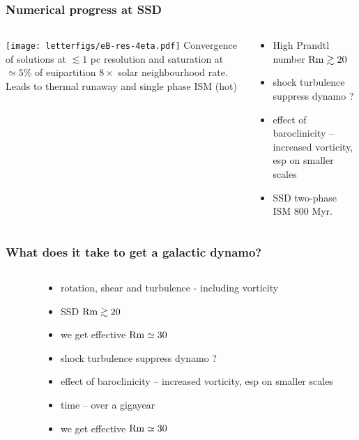 \documentclass{beamer}
\newcommand\Rm{{\rm Rm} }
\begin{document}
    \begin{frame}
      \frametitle{Numerical progress at SSD}
    \begin{columns}
      \begin{column}[]{6.5cm}
      \texttt{[image: letterfigs/eB-res-4eta.pdf]}
      {\footnotesize{
      Convergence of solutions at $\lesssim1$ pc resolution \cite{GMKS22}
      and saturation at $\simeq5$\% of euipartition 
      $8\times$ solar neighbourhood rate.\\
      Leads to thermal runaway \cite{LOCBN15} and single phase ISM (hot)}} 
      \end{column}
      \begin{column}[]{5.0cm}
      {\footnotesize{
      \begin{itemize}
        \item High Prandtl number $\Rm\gtrsim20$ \cite{SBK02,HB04,Schober12,SBSW20} 
        \item shock turbulence suppress dynamo \cite{Haugen:2004M,FCSBKS11,FSBS14}?
        \item effect of baroclinicity -- increased vorticity, esp on smaller scales \cite{Federrath:2010,KGVS18,GMKS22}
        \item SSD two-phase ISM \cite{SF22} 800 Myr.
      \end{itemize}
       \vspace{-0.2cm}
      }}
      \end{column}
    \end{columns}
    \end{frame}
    \begin{frame}
      \frametitle{What does it take to get a galactic dynamo?}
    \begin{columns}
      \begin{column}[]{6.5cm}
      {\footnotesize{\cite{Gent:2013b}}}
      \end{column}
      \begin{column}[]{6.25cm}
      {\footnotesize{
      \begin{itemize}
        \item rotation, shear and turbulence - including vorticity
        \item SSD $\Rm\gtrsim20$ \cite{SBK02,HB04,Schober12,SBSW20}
        \item we get effective $\Rm\simeq30$ \cite{HSSFG17}
        \item shock turbulence suppress dynamo \cite{Haugen:2004M,FCSBKS11,FSBS14}?
        \item effect of baroclinicity -- increased vorticity, esp on smaller scales \cite{KGVS18,SF22}
	\item time -- over a gigayear
        \item we get effective $\Rm\simeq30$ \cite{HSSFG17}
      \end{itemize}
       \vspace{-0.2cm}
      }}
      \end{column}
    \end{columns}
    \end{frame}
\end{document}
